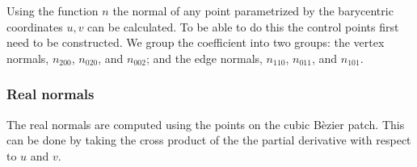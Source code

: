 Using the function $n$ the normal of any point parametrized by the barycentric coordinates $u, v$ can be calculated. To be able to do this the control points first need to be constructed. We group the coefficient into two groups: the vertex normals, $n_{200}$, $n_{020}$, and $n_{002}$; and the edge normals, $n_{110}$, $n_{011}$, and $n_{101}$. 

\subsubsection{Real normals}
\label{sss:method:normals:realNormals}
	The real normals are computed using the points on the cubic B\`ezier patch. This can be done by taking the cross product of the the partial derivative with respect to $u$ and $v$.
